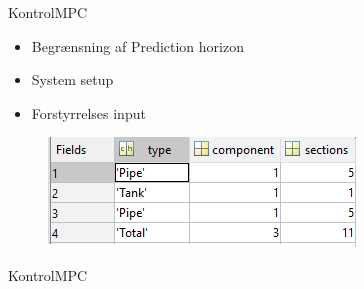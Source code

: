 \begin{frame}{Kontrol}{MPC}
  \vfill\vfill\centering



      \begin{minipage}[t]{0.48\linewidth}
    \begin{itemize}
    	\item Begrænsning af Prediction horizon
    	\item System setup
    	\item Forstyrrelses input
    \end{itemize}  
    	 \begin{figure}
	 \centering
	 
	\label{fig:MPC_test_o}
	\end{figure}  
\end{minipage}\hfill
\begin{minipage}[t]{0.48\linewidth}
\begin{figure}[!h]
\centering
\includegraphics[width=0.97 \textwidth]{figures/mpc_system_setup}
\label{fig:mpc_system_setup}
\end{figure}

\end{minipage}


\vfill\vfill
\end{frame}

\begin{frame}{Kontrol}{MPC}
	\vfill\vfill \centering
	\vspace{-6mm}
	 \begin{figure}
	 \centering
	 
	\label{fig:MPC_test_output_first_test}
	\end{figure}   
	\vspace{-10mm}
	\begin{figure}
	 \centering
	 
	\label{fig:tank_height_first_test}
	\end{figure} 
	\vfill\vfill
\end{frame}


